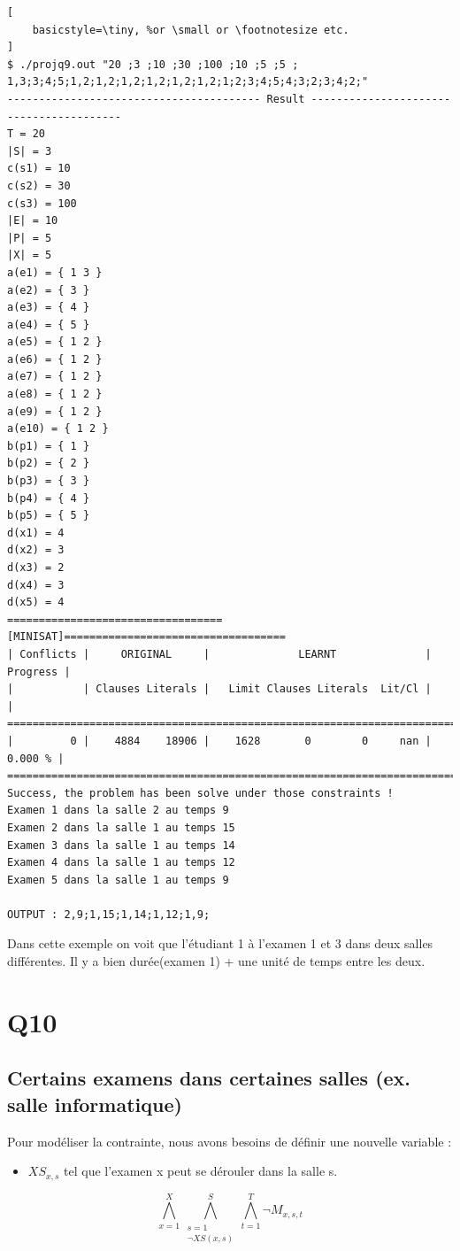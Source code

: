 \documentclass[a4paper,11pt]{article}
\begin{document}
\begin{lstlisting}[
    basicstyle=\tiny, %or \small or \footnotesize etc.
]
$ ./projq9.out "20 ;3 ;10 ;30 ;100 ;10 ;5 ;5 ; 1,3;3;4;5;1,2;1,2;1,2;1,2;1,2;1,2;1;2;3;4;5;4;3;2;3;4;2;"
---------------------------------------- Result ----------------------------------------
T = 20
|S| = 3
c(s1) = 10
c(s2) = 30
c(s3) = 100
|E| = 10
|P| = 5
|X| = 5
a(e1) = { 1 3 }
a(e2) = { 3 }
a(e3) = { 4 }
a(e4) = { 5 }
a(e5) = { 1 2 }
a(e6) = { 1 2 }
a(e7) = { 1 2 }
a(e8) = { 1 2 }
a(e9) = { 1 2 }
a(e10) = { 1 2 }
b(p1) = { 1 }
b(p2) = { 2 }
b(p3) = { 3 }
b(p4) = { 4 }
b(p5) = { 5 }
d(x1) = 4
d(x2) = 3
d(x3) = 2
d(x4) = 3
d(x5) = 4
==================================[MINISAT]===================================
| Conflicts |     ORIGINAL     |              LEARNT              | Progress |
|           | Clauses Literals |   Limit Clauses Literals  Lit/Cl |          |
==============================================================================
|         0 |    4884    18906 |    1628       0        0     nan |  0.000 % |
==============================================================================
Success, the problem has been solve under those constraints !
Examen 1 dans la salle 2 au temps 9
Examen 2 dans la salle 1 au temps 15
Examen 3 dans la salle 1 au temps 14
Examen 4 dans la salle 1 au temps 12
Examen 5 dans la salle 1 au temps 9

OUTPUT : 2,9;1,15;1,14;1,12;1,9;

\end{lstlisting}
Dans cette exemple on voit que l'étudiant 1 à l'examen 1 et 3 dans deux salles différentes. Il y a bien durée(examen 1) + une unité de temps entre les deux.

\section{Q10}
\subsection{Certains examens dans certaines salles (ex. salle informatique)}
Pour modéliser la contrainte, nous avons besoins de définir une nouvelle variable :  
\begin{itemize}
	\item \( XS_{x,s}\) tel que l'examen x peut se dérouler dans la salle s.
\end{itemize}
\begin{displaymath}
	\bigwedge\limits_{x=1}^{X}\bigwedge\limits_{\substack{s=1 \\ \neg XS(x,s)}}^{S}\bigwedge\limits_{t=1}^{T} \neg M_{x, s, t} 
\end{displaymath}
\end{document}
